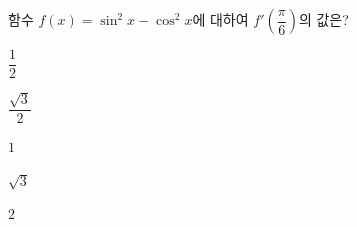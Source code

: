 함수 $f(x)=\sin^2 x-\cos^2 x$에 대하여 $f'\left(\dfrac{\pi}{6}\right)$의 값은?
\begin{choices32}{\rule[-3ex]{0pt}{8ex}$\dfrac{1}{2}$}{\rule[-3ex]{0pt}{8ex}$\dfrac{\sqrt{3}}{2}$}{\rule[-3ex]{0pt}{8ex}$1$}{\rule[-3ex]{0pt}{8ex}$\sqrt{3}$}{\rule[-3ex]{0pt}{8ex}$2$}\end{choices32}
